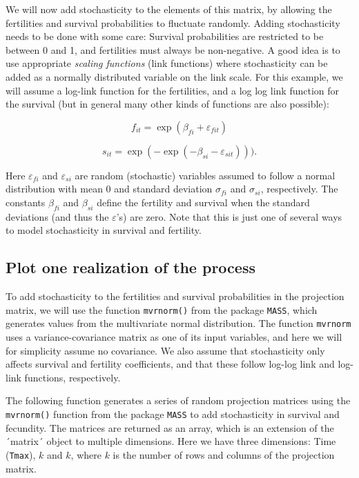 \documentclass[
]{book}
\begin{document}
We will now add stochasticity to the elements of this matrix, by allowing the fertilities and survival probabilities to fluctuate randomly. Adding stochasticity needs to be done with some care: Survival probabilities are restricted to be between 0 and 1, and fertilities must always be non-negative. A good idea is to use appropriate \emph{scaling functions} (link functions) where stochasticity can be added as a normally distributed variable on the link scale. For this example, we will assume a log-link function for the fertilities, and a log log link function for the survival (but in general many other kinds of functions are also possible):

\[f_{it}=\exp(\beta_{fi}+\varepsilon_{fit})\]

\[s_{it}=\exp(-\exp(-\beta_{si}-\varepsilon_{sit}))).\]

Here \(\varepsilon_{fi}\) and \(\varepsilon_{si}\) are random (stochastic) variables assumed to follow a normal distribution with mean 0 and standard deviation \(\sigma_{fi}\) and \(\sigma_{si}\), respectively. The constants \(\beta_{fi}\) and \(\beta_{si}\) define the fertility and survival when the standard deviations (and thus the \(\varepsilon\)'s) are zero. Note that this is just one of several ways to model stochasticity in survival and fertility.

\hypertarget{plot-one-realization-of-the-process-1}{%
\subsection*{Plot one realization of the process}\label{plot-one-realization-of-the-process-1}}

To add stochasticity to the fertilities and survival probabilities in the projection matrix, we will use the function \texttt{mvrnorm()} from the package \texttt{MASS}, which generates values from the multivariate normal distribution. The function \texttt{mvrnorm} uses a variance-covariance matrix as one of its input variables, and here we will for simplicity assume no covariance. We also assume that stochasticity only affects survival and fertility coefficients, and that these follow log-log link and log-link functions, respectively.

The following function generates a series of random projection matrices using the \texttt{mvrnorm()} function from the package \texttt{MASS} to add stochasticity in survival and fecundity. The matrices are returned as an array, which is an extension of the ´matrix´ object to multiple dimensions. Here we have three dimensions: Time (\texttt{Tmax}), \(k\) and \(k\), where \(k\) is the number of rows and columns of the projection matrix.
\end{document}
